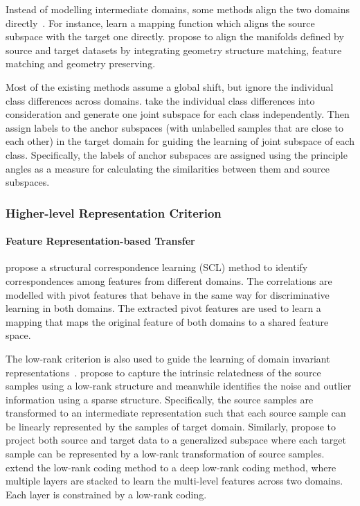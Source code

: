 \documentclass[prodmode]{acmsmall}  %
\begin{document}
Instead of modelling intermediate domains, some methods align the two domains directly~\cite{Fernando2013,Cui2014a}. For instance,  learn a mapping function which aligns the source subspace with the target one directly.  propose to align the manifolds defined by source and target datasets by integrating geometry structure matching, feature matching and geometry preserving.

Most of the existing methods assume a global shift, but ignore the individual class differences across domains.  take the individual class differences into consideration and generate one joint subspace for each class independently. Then assign labels to the anchor subspaces (with unlabelled samples that are close to each other) in the target domain for guiding the learning of joint subspace of each class. Specifically, the labels of anchor subspaces are assigned using the principle angles as a measure for calculating the similarities between them and source subspaces.
\subsubsection{Higher-level Representation Criterion}
\label{sec:HomoUnsupHRC}
\paragraph{Feature Representation-based Transfer}
 propose a structural correspondence learning (SCL) method to identify correspondences among features from different domains. The correlations are modelled with pivot features that behave in the same way for discriminative learning in both domains. The extracted pivot features are used to learn a mapping that maps the original feature of both domains to a shared feature space. 

The low-rank criterion is also used to guide the learning of domain invariant representations~\cite{Jhuo2012,Shao2014,Ding2015a}.  propose to capture the intrinsic relatedness of the source samples using a low-rank structure and meanwhile identifies the noise and outlier information using a sparse structure. Specifically, the source samples are transformed to an intermediate representation such that each source sample can be linearly represented by the samples of target domain. Similarly,  propose to project both source and target data to a generalized subspace where each target sample can be represented by a low-rank transformation of source samples.  extend the low-rank coding method to a deep low-rank coding method, where multiple layers are stacked to learn the multi-level features across two domains. Each layer is constrained by a low-rank coding.
\end{document}
